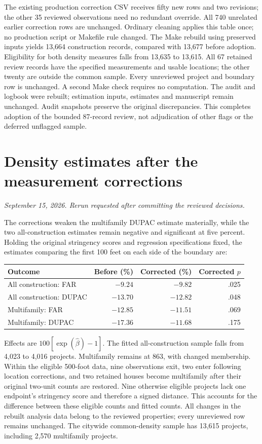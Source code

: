 The existing production correction CSV receives fifty new rows and two
revisions; the other 35 reviewed observations need no redundant override.
All 740 unrelated earlier correction rows are unchanged. Ordinary cleaning
applies this table once; no production script or Makefile rule changed.
The Make rebuild using preserved inputs yields 13,664 construction records,
compared with 13,677 before adoption. Eligibility for both density measures
falls from 13,635 to 13,615. All 67 retained review records have the specified
measurements and usable locations; the other twenty are outside the common
sample. Every unreviewed project and boundary row is unchanged. A second
Make check requires no computation. The audit and logbook were rebuilt;
estimation inputs, estimates and manuscript remain unchanged. Audit snapshots
preserve the original discrepancies. This completes adoption of the bounded
87-record review, not adjudication of other flags or the deferred unflagged
sample.

\clearpage
\section*{Density estimates after the measurement corrections}
\textit{September 15, 2026. Rerun requested after committing the reviewed decisions.}

The corrections weaken the multifamily DUPAC estimate materially, while the
two all-construction estimates remain negative and significant at five percent.
Holding the original stringency scores and regression specifications fixed,
the estimates comparing the first 100 feet on each side of the boundary are:

\begin{center}
\begin{tabular}{lrrr}
\hline
Outcome & Before (\%) & Corrected (\%) & Corrected $p$ \\
\hline
All construction: FAR & $-9.24$ & $-9.82$ & .025 \\
All construction: DUPAC & $-13.70$ & $-12.82$ & .048 \\
Multifamily: FAR & $-12.85$ & $-11.51$ & .069 \\
Multifamily: DUPAC & $-17.36$ & $-11.68$ & .175 \\
\hline
\end{tabular}
\end{center}

Effects are $100[\exp(\hat\beta)-1]$. The fitted all-construction sample falls
from 4,023 to 4,016 projects. Multifamily remains at 863, with changed membership.
Within the eligible 500-foot data, nine observations exit, two enter following
location corrections, and two retained houses become multifamily after their
original two-unit counts are restored. Nine otherwise eligible projects lack
one endpoint's stringency score and therefore a signed distance. This accounts
for the difference between these eligible counts and fitted counts. All changes in
the rebuilt analysis data belong to the reviewed properties; every unreviewed
row remains unchanged. The citywide common-density sample has 13,615 projects,
including 2,570 multifamily projects.


